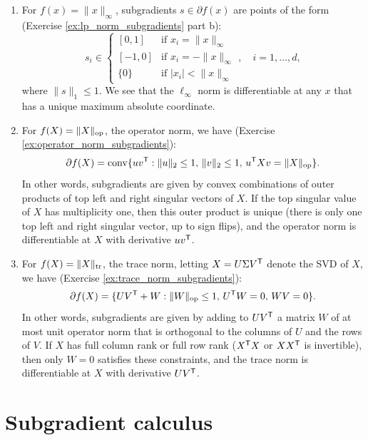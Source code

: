 \begin{Example}
\begin{enumerate}[label=\alph*., ref=\alph*]
\item {} 
  For $f(x) = \|x\|_\infty$, subgradients $s \in \partial f(x)$ are points of
  the form (Exercise \ref{ex:lp_norm_subgradients} part b): 
  \[
  s_i \in \begin{cases}
  [0,1] & \text{if $x_i = \|x\|_\infty$} \\   
  [-1,0] & \text{if $x_i = -\|x\|_\infty$} \\
  \{0\} & \text{if $|x_i| < \|x\|_\infty$}
  \end{cases}, \quad i=1,\dots,d,
  \]
  where $\|s\|_1 \leq 1$. We see that the $\ell_\infty$ norm is differentiable
  at any $x$ that has a unique maximum absolute coordinate.  

\item {} 
  For $f(X) = \|X\|_{\mathrm{op}}$, the operator norm, we have (Exercise
  \ref{ex:operator_norm_subgradients}):  
  \[
  \partial f(X) = \operatorname{conv} \{ u v^{\mathsf{T}} : \|u\|_2 \leq 1, \, \|v\|_2 \leq 1, \, u^{\mathsf{T}} X
  v =  \|X\|_{\mathrm{op}} \}.  
  \]
  In other words, subgradients are given by convex combinations of outer 
  products of top left and right singular vectors of $X$. If the top singular
  value of $X$ has multiplicity one, then this outer product is unique (there is
  only one top left and right singular vector, up to sign flips), and the
  operator norm is differentiable at $X$ with derivative $u v^{\mathsf{T}}$.         

\item {}  
  For $f(X) = \|X\|_{\operatorname{tr}}$, the trace norm, letting $X = U \Sigma V^{\mathsf{T}}$ denote
  the SVD of $X$, we have (Exercise \ref{ex:trace_norm_subgradients}):   
  \[
  \partial f(X) = \{ U V^{\mathsf{T}} + W: \|W\|_{\mathrm{op}} \leq 1, \, U^{\mathsf{T}} W = 0, \, W V = 0
  \}. 
  \]
  In other words, subgradients are given by adding to $U V^{\mathsf{T}}$ a matrix $W$ of
  at most unit operator norm that is orthogonal to the columns of $U$ and the
  rows of $V$. If $X$ has full column rank or full row rank ($X^{\mathsf{T}} X$ or $X
  X^{\mathsf{T}}$ is invertible), then only $W=0$ satisfies these constraints, and the
  trace norm is differentiable at $X$ with derivative $U V^{\mathsf{T}}$.    
\end{enumerate}
\end{Example}

\section{Subgradient calculus}

